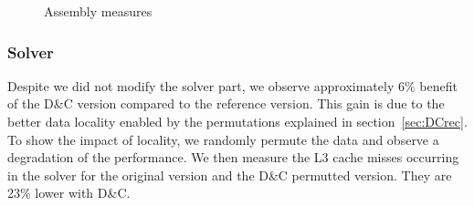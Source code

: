 \documentclass{IOS-Book-Article}
\begin{document}
\begin{figure}[htp]
 \centering
 \caption{Assembly measures}
 \label{fig:asmCurves}
\end{figure}

\subsubsection{Solver}
Despite we did not modify the solver part, we observe approximately 6\% benefit of the D\&C version compared to the reference version.
This gain is due to the better data locality enabled by the permutations explained in section~\ref{sec:DCrec}. To show the impact of locality, we randomly permute the data and observe a degradation of the performance. We then measure the L3 cache misses occurring in the solver for the original version and the D\&C permutted version. They are 23\% lower with D\&C.
\end{document}
